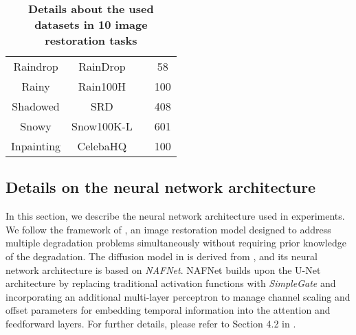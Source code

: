 \begin{table}[h]
\begin{minipage}{0.98\textwidth}
{\begin{tabular}{cccc}
                    \cmidrule(lr){1-4}
                    Raindrop                 &RainDrop                        &\cite{qian2018attentive}                                                        &58                    \\
                    \cmidrule(lr){1-4}
                    Rainy                    &Rain100H                        &\citep{yang2017deep}                                                            &100                   \\
                    \cmidrule(lr){1-4}
                    Shadowed                 &SRD                             &\citep{qu2017deshadownet}                                                       &408                   \\
                    \cmidrule(lr){1-4}
                    Snowy                    &Snow100K-L                      &\citep{liu2018desnownet}                                                        &601                   \\
                    \cmidrule(lr){1-4}
                    Inpainting               &CelebaHQ                        &\citep{lugmayr2022repaint}                                                      &100                   \\           
                    \bottomrule[1.5pt]
        \end{tabular}}
        \caption{\textbf{Details about the used datasets in 10 image restoration tasks}}
        \label{tab:dataset}
    \end{minipage}
\end{table}

\subsection{Details on the neural network architecture}
\label{appd2}

In this section, we describe the neural network architecture used in experiments. We follow the framework of \cite{luo2024daclip}, an image restoration model designed to address multiple degradation problems simultaneously without requiring prior knowledge of the degradation. The diffusion model in \cite{luo2024daclip} is derived from \cite{luo2023refusion}, and its neural network architecture is based on \textit{NAFNet}. NAFNet builds upon the U-Net architecture by replacing traditional activation functions with \textit{SimpleGate} and incorporating an additional multi-layer perceptron to manage channel scaling and offset parameters for embedding temporal information into the attention and feedforward layers. For further details, please refer to Section 4.2 in \cite{luo2023refusion}. 

